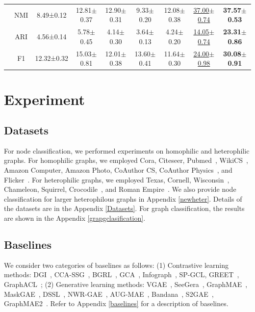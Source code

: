 \documentclass[sigconf]{acmart}
\begin{document}
\begin{table}[ht]
\begin{tabular}{c|c|ccccccc}
        &NMI &8.49±0.12 &12.81$\pm$0.37 & 12.90$\pm$0.31&9.33$\pm$0.20&12.08$\pm$0.38&\underline{37.00$\pm$0.74}&\textbf{37.57$\pm$0.53}\\
        & ARI &4.56±0.14 & 5.78$\pm$0.45 & 4.14$\pm$0.30& 3.64$\pm$0.13 & 4.24$\pm$0.20&\underline{14.05$\pm$0.74}& \textbf{23.31$\pm$0.86} \\
        &F1 & 12.32±0.32 &  15.03$\pm$0.81 & 12.01$\pm$0.38&13.60$\pm$0.41 & 11.64$\pm$0.30&\underline{24.00$\pm$0.98} & \textbf{30.08$\pm$0.91} \\      
        \bottomrule
    \end{tabular}
    \label{table.cluster}
\end{table}

\section{Experiment}

\subsection{Datasets}
For node classification, we performed experiments on homophilic and heterophilic graphs. For homophilic graphs, we employed Cora, Citeseer, Pubmed~\cite{gcn, collective}, WikiCS~\cite{wiki},  Amazon Computer, Amazon Photo, CoAuthor CS, CoAuthor Physics~\cite{cs, photo}, and Flicker~\cite{graphsaint-iclr20}. For heterophilic graphs, we employed Texas, Cornell, Wisconsin~\cite{geom-gcn}, Chameleon, Squirrel, Crocodile~\cite{squchame}, and Roman Empire~\cite{roman}. We also provide node classification for larger heterophilous graphs in Appendix \ref{newheter}. Details of the datasets are in the Appendix \ref{Datasets}. For graph classification, the results are shown in the Appendix \ref{grapgclasification}.

\subsection{Baselines}
We consider two categories of baselines as follows: (1) Contrastive learning methods: DGI~\cite{dgi}, CCA-SSG~\cite{ccassg}, BGRL~\cite{BGRL}, GCA~\cite{GCA}, Infograph~\cite{infograph}, SP-GCL, GREET~\cite{greet}, GraphACL~\cite{graphacl}; (2) Generative learning methods: VGAE~\cite{vgae}, SeeGera~\cite{seegera}, GraphMAE~\cite{graphmae}, MaskGAE~\cite{maskgae}, DSSL~\cite{dssl}, NWR-GAE~\cite{NWR-GAE}, AUG-MAE~\cite{augmae}, Bandana~\cite{bandana}, S2GAE~\cite{s2gae}, GraphMAE2~\cite{graphmae2}. Refer to Appendix \ref{baselines} for a description of baselines.
\end{document}

